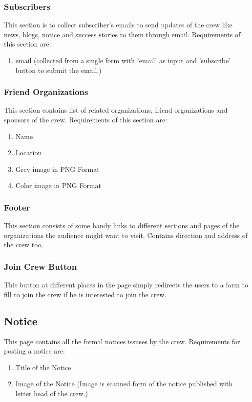 				\subsubsection{Subscribers}
				This section is to collect subscriber's emails to send updates of the crew like news, blogs, notice and success stories to them through email. Requirements of this section are:
				\begin{enumerate}
					\item email (collected from a single form with 'email' as input and 'subscribe' button to submit the email.)
				\end{enumerate}
			\subsubsection{Friend Organizations}
				This section contains list of related organizations, friend organizations and sponsors of the crew. Requirements of this section are:
				\begin{enumerate}
					\item Name
					\item Location
					\item Grey image in PNG Format
					\item Color image in PNG Format
				\end{enumerate}
			\subsubsection{Footer}
				This section consists of some handy links to different sections and pages of the organizations the audience might want to visit. Contains direction and address of the crew too.
			\subsubsection{Join Crew Button}
				This button at different places in the page simply redirects the users to a form to fill to join the crew if he is interested to join the crew.
		\subsection{Notice}
		This page contains all the formal notices issuses by the crew. Requirements for posting a notice are:
		\begin{enumerate}
			\item Title of the Notice
			\item Image of the Notice (Image is scanned form of the notice published with letter head of the crew.)
		\end{enumerate}

